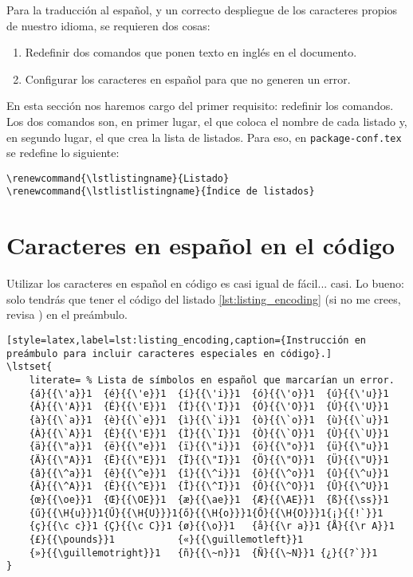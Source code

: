 Para la traducción al español, y un correcto despliegue de los caracteres propios de nuestro idioma, se requieren dos cosas:
\begin{enumerate}
	\item Redefinir dos comandos que ponen texto en inglés en el documento.
	\item Configurar los caracteres en español para que no generen un error.
\end{enumerate}

En esta sección nos haremos cargo del primer requisito: redefinir los comandos. Los dos comandos son, en primer lugar, el que coloca el nombre de cada listado y, en segundo lugar, el que crea la lista de listados. Para eso, en \texttt{package-conf.tex} se redefine lo siguiente:

\begin{lstlisting}[style=latex]
\renewcommand{\lstlistingname}{Listado}
\renewcommand{\lstlistlistingname}{Índice de listados}
\end{lstlisting}



\section{Caracteres en español en el código}
\label{sec:caracteres_en_espanol}



Utilizar los caracteres en español en código es casi igual de fácil... casi. Lo bueno: solo tendrás que tener el código del listado \ref{lst:listing_encoding} (si no me crees, revisa \cite{bib:listing_encoding}) en el preámbulo.

\begin{lstlisting}[style=latex,label=lst:listing_encoding,caption={Instrucción en preámbulo para incluir caracteres especiales en código}.]
\lstset{
    literate= % Lista de símbolos en español que marcarían un error.
    {á}{{\'a}}1  {é}{{\'e}}1  {í}{{\'i}}1  {ó}{{\'o}}1  {ú}{{\'u}}1
    {Á}{{\'A}}1  {É}{{\'E}}1  {Í}{{\'I}}1  {Ó}{{\'O}}1  {Ú}{{\'U}}1
    {à}{{\`a}}1  {è}{{\`e}}1  {ì}{{\`i}}1  {ò}{{\`o}}1  {ù}{{\`u}}1
    {À}{{\`A}}1  {È}{{\'E}}1  {Ì}{{\`I}}1  {Ò}{{\`O}}1  {Ù}{{\`U}}1
    {ä}{{\"a}}1  {ë}{{\"e}}1  {ï}{{\"i}}1  {ö}{{\"o}}1  {ü}{{\"u}}1
    {Ä}{{\"A}}1  {Ë}{{\"E}}1  {Ï}{{\"I}}1  {Ö}{{\"O}}1  {Ü}{{\"U}}1
    {â}{{\^a}}1  {ê}{{\^e}}1  {î}{{\^i}}1  {ô}{{\^o}}1  {û}{{\^u}}1
    {Â}{{\^A}}1  {Ê}{{\^E}}1  {Î}{{\^I}}1  {Ô}{{\^O}}1  {Û}{{\^U}}1
    {œ}{{\oe}}1  {Œ}{{\OE}}1  {æ}{{\ae}}1  {Æ}{{\AE}}1  {ß}{{\ss}}1
    {ű}{{\H{u}}}1{Ű}{{\H{U}}}1{ő}{{\H{o}}}1{Ő}{{\H{O}}}1{¡}{{!`}}1
    {ç}{{\c c}}1 {Ç}{{\c C}}1 {ø}{{\o}}1   {å}{{\r a}}1 {Å}{{\r A}}1
    {£}{{\pounds}}1           {«}{{\guillemotleft}}1
    {»}{{\guillemotright}}1   {ñ}{{\~n}}1  {Ñ}{{\~N}}1 {¿}{{?`}}1
}
\end{lstlisting}

